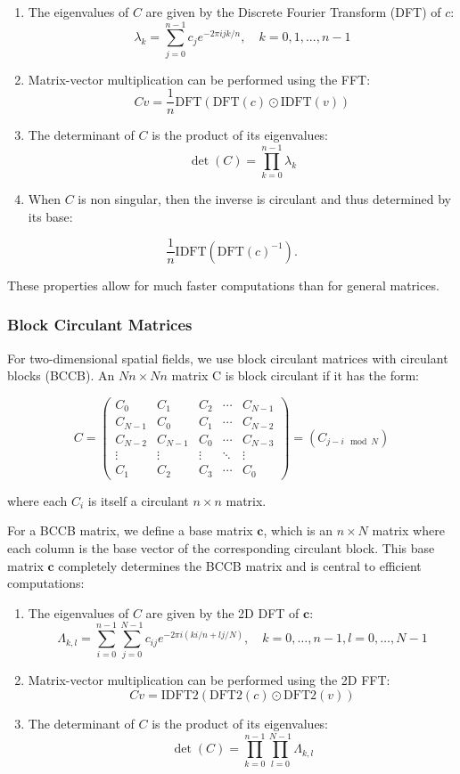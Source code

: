 \documentclass[journal=,manuscript=]{achemso}
\begin{document}
\begin{enumerate}
\def\labelenumi{\arabic{enumi}.}
\item
  The eigenvalues of \(C\) are given by the Discrete Fourier Transform
  (DFT) of \(c\): \[
  \lambda_k = \sum_{j=0}^{n-1} c_j e^{-2\pi i jk/n}, \quad k = 0, 1, ..., n-1
  \]
\item
  Matrix-vector multiplication can be performed using the FFT: \[
  Cv = \frac1n\text{DFT}(\text{DFT}(c) \odot \text{IDFT}(v))
  \]
\item
  The determinant of \(C\) is the product of its eigenvalues: \[
  \det(C) = \prod_{k=0}^{n-1} \lambda_k
  \]
\item
  When \(C\) is non singular, then the inverse is circulant and thus
  determined by its base:
\end{enumerate}

\[
\frac1n \text{IDFT}(\text{DFT}(c)^{-1}).
\]

These properties allow for much faster computations than for general
matrices.

\subsubsection{Block Circulant Matrices}\label{block-circulant-matrices}

For two-dimensional spatial fields, we use block circulant matrices with
circulant blocks (BCCB). An \(Nn \times Nn\) matrix C is block circulant
if it has the form:

\[
C = \begin{pmatrix}
C_0 & C_1 & C_2 & \cdots & C_{N-1} \\
C_{N-1} & C_0 & C_1 & \cdots & C_{N-2} \\
C_{N-2} & C_{N-1} & C_0 & \cdots & C_{N-3} \\
\vdots & \vdots & \vdots & \ddots & \vdots \\
C_1 & C_2 & C_3 & \cdots & C_0
\end{pmatrix} = (C_{j-i \mod N})
\]

where each \(C_i\) is itself a circulant \(n \times n\) matrix.

For a BCCB matrix, we define a base matrix \(\mathbf c\), which is an
\(n \times N\) matrix where each column is the base vector of the
corresponding circulant block. This base matrix \(\mathbf c\) completely
determines the BCCB matrix and is central to efficient computations:

\begin{enumerate}
\def\labelenumi{\arabic{enumi}.}
\item
  The eigenvalues of \(C\) are given by the 2D DFT of \(\mathbf c\): \[
  \Lambda_{k,l} = \sum_{i=0}^{n-1} \sum_{j=0}^{N-1} c_{ij} e^{-2\pi i (ki/n + lj/N)}, \quad k = 0, \dots, n-1, l = 0, \dots, N-1
  \]
\item
  Matrix-vector multiplication can be performed using the 2D FFT: \[
  Cv = \text{IDFT2}(\text{DFT2}(c) \odot \text{DFT2}(v))
  \]
\item
  The determinant of \(C\) is the product of its eigenvalues: \[
  \det(C) = \prod_{k=0}^{n-1} \prod_{l=0}^{N-1} \Lambda_{k,l}
  \]
\end{enumerate}
\end{document}

